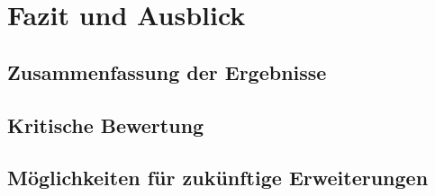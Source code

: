 

\newpage
\section{Fazit und Ausblick}
\label{Fazit und Ausblick}

\subsection{Zusammenfassung der Ergebnisse}

\subsection{Kritische Bewertung}

\subsection{Möglichkeiten für zukünftige Erweiterungen}